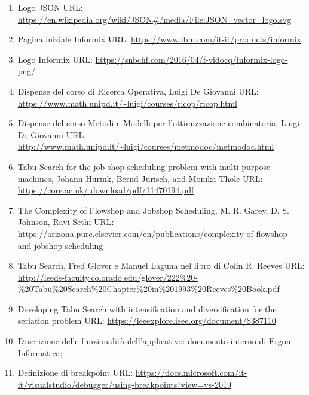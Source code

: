 \begin{enumerate}
    \item \label{jlogo} Logo JSON URL: \url{https://en.wikipedia.org/wiki/JSON#/media/File:JSON_vector_logo.svg}
    
    \item \label{informix} Pagina iniziale Informix URL: \url{https://www.ibm.com/it-it/products/informix}
    
    \item \label{ilogo} Logo Informix URL: \url{https://snbchf.com/2016/04/f-vidocq/informix-logo-png/}
    
    \item \label{slide0} Dispense del corso di Ricerca Operativa, Luigi De Giovanni URL:
     \url{https://www.math.unipd.it/~luigi/courses/ricop/ricop.html}
    
    \item \label{slide} Dispense del corso Metodi e Modelli per l'ottimizzazione combinatoria, Luigi De Giovanni URL:
     \url{http://www.math.unipd.it/~luigi/courses/metmodoc/metmodoc.html}
    
    \item \label{tabu} Tabu Search for the job-shop scheduling problem with multi-purpose machines,
    Johann Hurink, Bernd Jurisch, and Monika Thole URL: \url{https://core.ac.uk/
    download/pdf/11470194.pdf}

    \item \label{scheduling} The Complexity of Flowshop and Jobshop Scheduling, M. R. Garey, D. S. Johnson,
    Ravi Sethi URL: \url{https://arizona.pure.elsevier.com/en/publications/complexity-of-flowshop-and-jobshop-scheduling}

    \item \label{list} Tabu Search, Fred Glover e Manuel Laguna nel libro di Colin R. Reeves URL:  
    \url{http://leeds-faculty.colorado.edu/glover/222%20-%20Tabu%20Search%20Chapter%20in%201993%20Reeves%20Book.pdf}

    \item \label{criteria} Developing Tabu Search with intensification and diversification for the seriation problem URL: 
    \url{https://ieeexplore.ieee.org/document/8387110}

    \item \label{alert} Descrizione delle funzionalità dell'applicativo: documento interno di Ergon Informatica;
    
    \item \label{breakpoint} Definizione di breakpoint URL: \url{https://docs.microsoft.com/it-it/visualstudio/debugger/using-breakpoints?view=vs-2019}


\end{enumerate}
